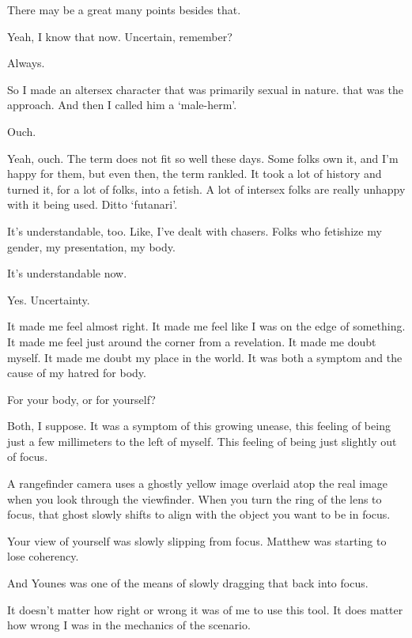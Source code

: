 \begin{paracol}{2}
\begin{leftcolumn}
\begin{ally}
There may be a great many points besides that.
\end{ally}
Yeah, I know that now. Uncertain, remember?

\begin{ally}
Always.
\end{ally}
So I made an altersex character that was primarily sexual in nature. that was the approach. And then I called him a `male-herm'.

\begin{ally}
Ouch.
\end{ally}
Yeah, ouch. The term does not fit so well these days. Some folks own it, and I'm happy for them, but even then, the term rankled. It took a lot of history and turned it, for a lot of folks, into a fetish. A lot of intersex folks are really unhappy with it being used. Ditto `futanari'.

It's understandable, too. Like, I've dealt with chasers. Folks who fetishize my gender, my presentation, my body.

\begin{ally}
It's understandable now.
\end{ally}
Yes. Uncertainty.

It made me feel almost right. It made me feel like I was on the edge of something. It made me feel just around the corner from a revelation. It made me doubt myself. It made me doubt my place in the world. It was both a symptom and the cause of my hatred for body.

\begin{ally}
For your body, or for yourself?
\end{ally}
Both, I suppose. It was a symptom of this growing unease, this feeling of being just a few millimeters to the left of myself. This feeling of being just slightly out of focus.

A rangefinder camera uses a ghostly yellow image overlaid atop the real image when you look through the viewfinder. When you turn the ring of the lens to focus, that ghost slowly shifts to align with the object you want to be in focus.

\begin{ally}
Your view of yourself was slowly slipping from focus. Matthew was starting to lose coherency.
\end{ally}
And Younes was one of the means of slowly dragging that back into focus.

It doesn't matter how right or wrong it was of me to use this tool. It does matter how wrong I was in the mechanics of the scenario.


\end{leftcolumn}
\end{paracol}
